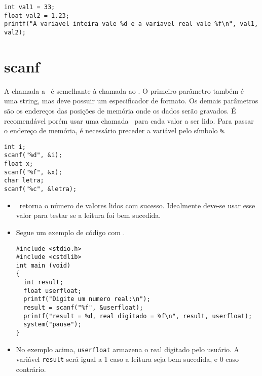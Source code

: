 \begin{lstlisting}
int val1 = 33;
float val2 = 1.23;
printf("A variavel inteira vale %d e a variavel real vale %f\n", val1, val2);
\end{lstlisting}






\section{scanf}
\label{sec:scanf}

A chamada a \SCANF\ é semelhante à chamada ao \PRINTF. O primeiro parâmetro também é uma string, mas deve possuir um especificador de formato. Os demais parâmetros são os endereços das posições de memória onde os dados serão gravados. É recomendável porém usar uma chamada \SCANF\ para cada valor a ser lido. Para passar o endereço de memória, é necessário preceder a variável pelo símbolo {\tt \%}.

\begin{lstlisting}
int i;
scanf("%d", &i);
float x;
scanf("%f", &x);
char letra;
scanf("%c", &letra);
\end{lstlisting}

\begin{itemize}

\item \SCANF\ retorna o número de valores lidos com sucesso. Idealmente deve-se usar esse valor para testar se a leitura foi bem sucedida.

\item Segue um exemplo de código com \SCANF.

\begin{lstlisting}
#include <stdio.h> 
#include <cstdlib> 
int main (void)
{
  int result;
  float userfloat;
  printf("Digite um numero real:\n");
  result = scanf("%f", &userfloat);
  printf("result = %d, real digitado = %f\n", result, userfloat);
  system("pause");
}
\end{lstlisting}

\item No exemplo acima, {\tt userfloat} armazena o real digitado pelo usuário. A variável {\tt result} será igual a 1 caso a leitura seja bem sucedida, e 0 caso contrário.

\end{itemize}


